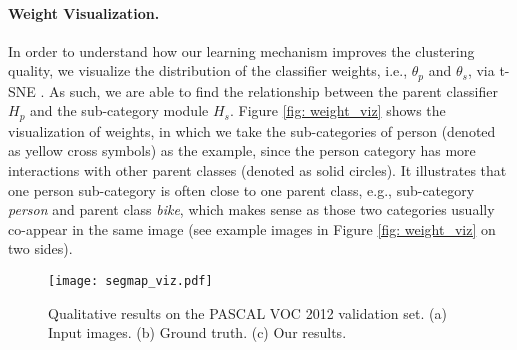 \documentclass[10pt,twocolumn,letterpaper]{article}
\begin{document}
\paragraph{Weight Visualization.}
In order to understand how our learning mechanism improves the clustering quality, we visualize the distribution of the classifier weights, i.e., $\theta_p$ and $\theta_s$, via t-SNE \cite{maaten2008visualizing}.
As such, we are able to find the relationship between the parent classifier $H_p$ and the sub-category module $H_s$.
Figure \ref{fig: weight_viz} shows the visualization of weights, in which we take the sub-categories of person (denoted as yellow cross symbols) as the example, since the person category has more interactions with other parent classes (denoted as solid circles).
It illustrates that one person sub-category is often close to one parent class, e.g., sub-category \textit{person} and parent class \textit{bike}, which makes sense as those two categories usually co-appear in the same image (see example images in Figure \ref{fig: weight_viz} on two sides).







\begin{figure*}[!t]
	\centering
	\texttt{[image: segmap\_viz.pdf]} \\
	\vspace{-2mm}
	\caption{Qualitative results on the PASCAL VOC 2012 validation set.
	(a) Input images. (b) Ground truth. (c) Our results.
	}
	\label{fig: segmap_viz}
	
\end{figure*}
\end{document}
